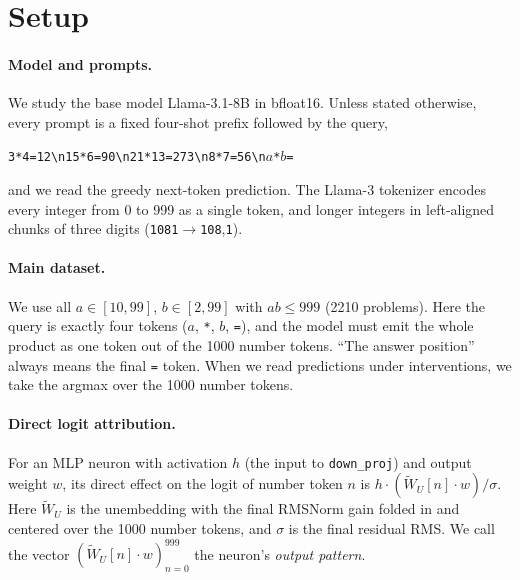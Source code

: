 \documentclass[11pt]{article}
\newcommand{\eq}{\texttt{=}}
\begin{document}
\section{Setup}
\label{sec:setup}
\paragraph{Model and prompts.} We study the base model Llama-3.1-8B in bfloat16. Unless stated otherwise, every prompt is a fixed four-shot prefix followed by the query,
\begin{center}\texttt{3*4=12\textbackslash n15*6=90\textbackslash n21*13=273\textbackslash n8*7=56\textbackslash n$a$*$b$=}\end{center}
and we read the greedy next-token prediction. The Llama-3 tokenizer encodes every integer from 0 to 999 as a single token, and longer integers in left-aligned chunks of three digits (\texttt{1081}$\to$\texttt{108},\texttt{1}).

\paragraph{Main dataset.} We use all $a\in[10,99]$, $b\in[2,99]$ with $ab\le 999$ (2210 problems). Here the query is exactly four tokens (\texttt{$a$}, \texttt{*}, \texttt{$b$}, \eq{}), and the model must emit the whole product as one token out of the 1000 number tokens. ``The answer position'' always means the final \eq{} token. When we read predictions under interventions, we take the argmax over the 1000 number tokens.

\paragraph{Direct logit attribution.} For an MLP neuron with activation $h$ (the input to \texttt{down\_proj}) and output weight $w$, its direct effect on the logit of number token $n$ is $h\cdot(\tilde W_U[n]\cdot w)/\sigma$. Here $\tilde W_U$ is the unembedding with the final RMSNorm gain folded in and centered over the 1000 number tokens, and $\sigma$ is the final residual RMS. We call the vector $(\tilde W_U[n]\cdot w)_{n=0}^{999}$ the neuron's \emph{output pattern}.
\end{document}
